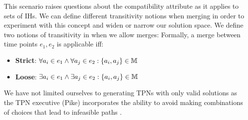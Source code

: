 This scenario raises questions about the compatibility attribute as it applies to sets of IHs. We can define different transitivity notions when merging in order to experiment with this concept and widen or narrow our solution space.
We define two notions of transitivity in when we allow merges:
Formally, a merge between time points $e_1,e_2$ is applicable iff:
\begin{itemize}
    \item \textbf{Strict}: $\forall a_i \in e_1 \wedge \forall a_j \in e_2:   \{a_i,a_j\} \in \mathbb{M}$ 
    \item \textbf{Loose}: $\exists a_i \in e_1 \wedge \exists a_j \in e_2: \{a_i,a_j\} \in \mathbb{M}$
\end{itemize}

We have not limited ourselves to generating TPNs with only valid solutions as the TPN executive (Pike) incorporates the ability to avoid making combinations of choices that lead to infeasible paths \cite{levine2018watching}.
